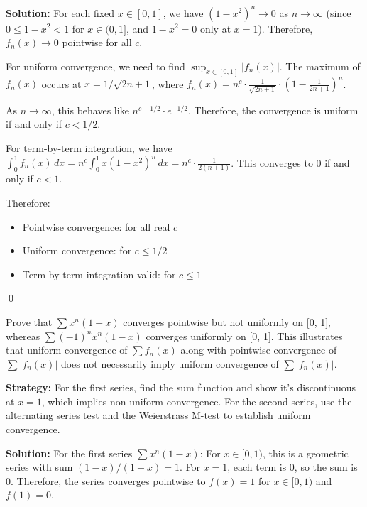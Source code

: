 \bigskip\noindent\textbf{Solution:} For each fixed \( x \in [0, 1] \), we have \( (1 - x^2)^n \to 0 \) as \( n \to \infty \) (since \( 0 \leq 1 - x^2 < 1 \) for \( x \in (0, 1] \), and \( 1 - x^2 = 0 \) only at \( x = 1 \)). Therefore, \( f_n(x) \to 0 \) pointwise for all \( c \).

For uniform convergence, we need to find \( \sup_{x \in [0,1]} |f_n(x)| \). The maximum of \( f_n(x) \) occurs at \( x = 1/\sqrt{2n + 1} \), where \( f_n(x) = n^c \cdot \frac{1}{\sqrt{2n + 1}} \cdot \left(1 - \frac{1}{2n + 1}\right)^n \).

As \( n \to \infty \), this behaves like \( n^{c - 1/2} \cdot e^{-1/2} \). Therefore, the convergence is uniform if and only if \( c < 1/2 \).

For term-by-term integration, we have \( \int_0^1 f_n(x) \, dx = n^c \int_0^1 x(1 - x^2)^n \, dx = n^c \cdot \frac{1}{2(n + 1)} \). This converges to 0 if and only if \( c < 1 \).

Therefore:
\begin{itemize}
\item Pointwise convergence: for all real \( c \)
\item Uniform convergence: for \( c \le 1/2 \)
\item Term-by-term integration valid: for \( c \le 1 \)
\end{itemize}\qed


\begin{problembox}
\begin{problemstatement}
Prove that \( \sum x^n (1 - x) \) converges pointwise but not uniformly on [0, 1], whereas \( \sum (-1)^n x^n (1 - x) \) converges uniformly on [0, 1]. This illustrates that uniform convergence of \( \sum f_n(x) \) along with pointwise convergence of \( \sum |f_n(x)| \) does not necessarily imply uniform convergence of \( \sum |f_n(x)| \).
\end{problemstatement}
\end{problembox}

\noindent\textbf{Strategy:} For the first series, find the sum function and show it's discontinuous at \( x = 1 \), which implies non-uniform convergence. For the second series, use the alternating series test and the Weierstrass M-test to establish uniform convergence.

\bigskip\noindent\textbf{Solution:} For the first series \( \sum x^n (1 - x) \): For \( x \in [0, 1) \), this is a geometric series with sum \( (1 - x)/(1 - x) = 1 \). For \( x = 1 \), each term is 0, so the sum is 0. Therefore, the series converges pointwise to \( f(x) = 1 \) for \( x \in [0, 1) \) and \( f(1) = 0 \).

